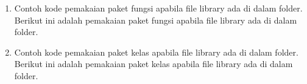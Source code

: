 \begin{enumerate}
	\item Contoh kode pemakaian paket fungsi apabila file library ada di dalam folder. Berikut ini adalah pemakaian paket fungsi apabila file library ada di dalam folder.
	
	
	\item Contoh kode pemakaian paket kelas apabila file library ada di dalam folder. Berikut ini adalah pemakaian paket kelas apabila file library ada di dalam folder.
	
\end{enumerate}

